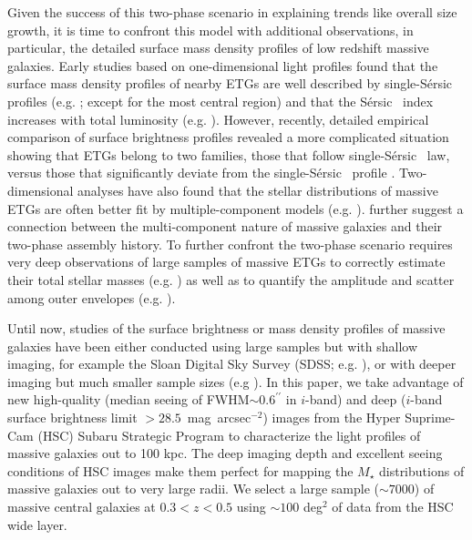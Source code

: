 \documentclass[a4paper,fleqn,usenatbib]{mnras}
\def\arcsec{{\prime\prime}}
\def\sb{mag~arcsec$^{-2}$}
\def\ser{{S\'{e}rsic\ }}
\def\mstar{{$M_{\star}$}}
\begin{document}
    Given the success of this two-phase scenario in explaining trends like overall size 
    growth, it is time to confront this model with additional observations, 
    in particular, the detailed surface mass density profiles of low redshift massive 
    galaxies. 
    Early studies based on one-dimensional light profiles found that the surface 
    mass density profiles of nearby ETGs are well described by single-\ser{} profiles 
    (e.g. \citealt{Kormendy2009}; except for the most central region) and that the 
    \ser{} index increases with total luminosity 
    (e.g. \citealt{Graham2013}). 
    However, recently, detailed empirical comparison of surface brightness profiles 
    revealed a more complicated situation showing that ETGs belong to two families, 
    those that follow single-\ser{} law, versus those that significantly deviate from 
    the single-\ser{} profile \citep{Schombert2015}.  
    Two-dimensional analyses have also found that the stellar distributions of massive 
    ETGs are often better fit by multiple-component models 
    (e.g. \citealt{Huang2013a, Oh2017}).  
    \citet{Huang2013b} further suggest a connection between the multi-component 
    nature of massive galaxies and their two-phase assembly history. 
    To further confront the two-phase scenario requires very deep observations of 
    large samples of massive ETGs to correctly estimate their total stellar masses
    (e.g. \citealt{Bernardi2013, DSouza2014}) as well as to quantify the amplitude and 
    scatter among outer envelopes (e.g. \citealt{Capaccioli2015, Iodice2016, 
    Iodice2017}).
    
    Until now, studies of the surface brightness or mass density profiles of massive 
    galaxies have been either conducted using large samples but with shallow imaging, 
    for example the Sloan Digital Sky Survey (SDSS; e.g. \citealt{SDSSDR7, SDSSDR12}), 
    or with deeper imaging but much smaller sample sizes (e.g \citealt{Gonzalez2005, 
    Capaccioli2015}). 
    In this paper, we take advantage of new high-quality (median seeing of
    FWHM${\sim} 0.6^{\arcsec}$ in $i$-band) and deep ($i$-band surface brightness 
    limit $> 28.5$~\sb) images from the Hyper Suprime-Cam (HSC) Subaru Strategic 
    Program \citep[SSP,][]{HSCDR1} to characterize the light profiles of massive 
    galaxies out to 100 kpc. 
    The deep imaging depth and excellent seeing conditions of HSC images make them 
    perfect for mapping the \mstar{} distributions of massive galaxies out to very 
    large radii. 
    We select a large sample (${\sim} 7000$) of massive central galaxies 
    at $0.3 < z < 0.5$ using ${\sim} 100$ deg$^2$ of data from the HSC wide layer. 
    
\end{document}
